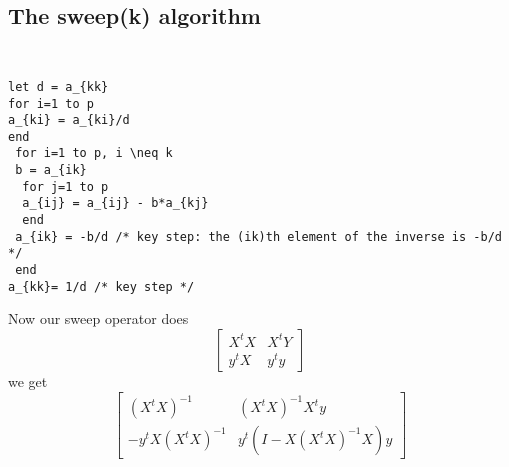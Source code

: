 \documentclass{article}
\begin{document}
\subsection{The sweep(k) algorithm}
{\tt
\begin{verbatim}
let d = a_{kk}
for i=1 to p
a_{ki} = a_{ki}/d
end
 for i=1 to p, i \neq k
 b = a_{ik}
  for j=1 to p
  a_{ij} = a_{ij} - b*a_{kj}
  end
 a_{ik} = -b/d /* key step: the (ik)th element of the inverse is -b/d */
 end
a_{kk}= 1/d /* key step */
\end{verbatim}
}
Now our sweep operator does 
\[
\left[\begin{array}{cc}
X^tX & X^tY\\
y^tX & y^ty \end{array} \right] \]
we get
\[\left[\begin{array}{cc}
(X^tX)^{-1} & (X^tX)^{-1}X^ty \\
-y^tX(X^tX)^{-1} & y^t(I- X(X^tX)^{-1}X)y
\end{array}\right]\]
\end{document}
